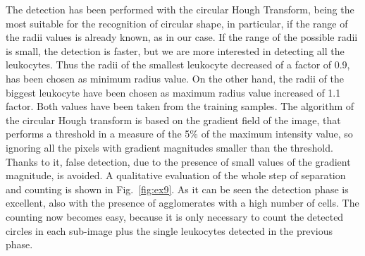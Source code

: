 \documentclass[final,a4paper,12pt,english]{UnicaPhdThesis3}
\begin{document}
{The detection has been performed with the circular Hough Transform, being the most suitable for the recognition of circular shape, in particular, if the range of the radii values is already known, as in our case. If the range of the possible radii is small, the detection is faster, but we are more interested in detecting all the leukocytes. Thus the radii of the smallest leukocyte decreased of a factor of 0.9, has been chosen as minimum radius value. On the other hand, the radii of the biggest leukocyte have been chosen as maximum radius value increased of 1.1 factor. Both values have been taken from the training samples. The algorithm of the circular Hough transform is based on the gradient field of the image, that performs a threshold in a measure of the 5\% of the maximum intensity value, so ignoring all the pixels with gradient magnitudes smaller than the threshold. Thanks to it, false detection, due to the presence of small values of the gradient magnitude, is avoided. A qualitative evaluation of the whole step of separation and counting is shown in Fig.~\ref{fig:ex9}.  As it can be seen the detection phase is excellent, also with the presence of agglomerates with a high number of cells. The counting now becomes easy, because it is only necessary to count the detected circles in each sub-image plus the single leukocytes detected in the previous phase.

}
\end{document}
